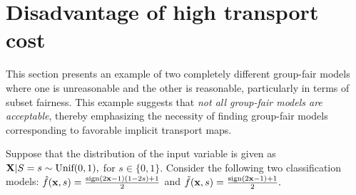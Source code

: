 \documentclass[10pt]{article} %
\begin{document}




\clearpage
\section{Disadvantage of high transport cost}\label{sec:highcost}

This section presents an example of two completely different group-fair models where one is unreasonable and the other is reasonable, particularly in terms of subset fairness.
This example suggests that \textit{not all group-fair models are acceptable}, thereby emphasizing the necessity of finding group-fair models corresponding to favorable implicit transport maps.

Suppose that the distribution of the input variable is given as
$\mathbf{X}|S=s \sim \textup{Unif}(0, 1),$ for $ s \in \{0, 1\}.$
Consider the following two classification models:
$\hat{f} (\mathbf{x},s) = \frac{\textup{sign} \left( 2 \mathbf{x} - 1 \right) \left( 1 - 2s \right) + 1}{2} $ and $\tilde{f} (\mathbf{x},s) = \frac{\textup{sign} \left( 2 \mathbf{x} - 1 \right) + 1}{2}.$
\end{document}

